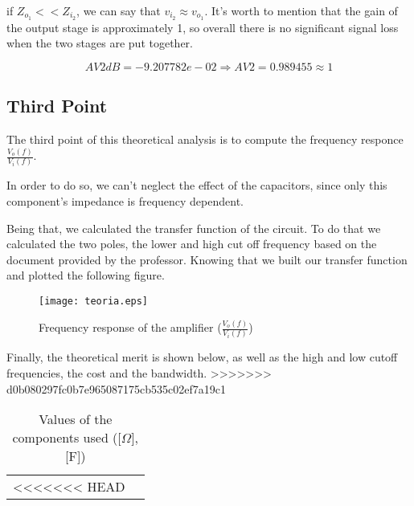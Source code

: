 \noindent if $Z_{o_1}<<Z_{i_2}$, we can say that $v_{i_2} \approx v_{o_1}$. It's worth to mention that the gain of the output stage is approximately 1, so overall there is no significant signal loss when the two stages are put together.

\begin{equation}
	AV2dB = -9.207782e-02 \Rightarrow AV2 = 0.989455 \approx 1
\end{equation}

\subsection{Third Point}

\par The third point of this theoretical analysis is to compute the frequency responce $\frac{V_o(f)}{V_i(f)}$. 
\par In order to do so, we can't neglect the effect of the capacitors, since only this component's impedance is frequency dependent.
\par Being that, we calculated the transfer function of the circuit. To do that we calculated the two poles, the lower and high cut off frequency based on the document provided by the professor. Knowing that we built our transfer function and plotted the following figure.

\begin{figure}[H] 
	\centering
	\texttt{[image: teoria.eps]}
	\caption{Frequency response of the amplifier ($\frac{V_o(f)}{V_i(f)}$)}
\end{figure}

\par Finally, the theoretical merit is shown below, as well as the high and low cutoff frequencies, the cost and the bandwidth.
>>>>>>> d0b080297fc0b7e965087175cb535c02ef7a19c1

\vspace{5mm}
\begin{table}[H]
	\centering
	\begin{tabularx}{0.9\textwidth} {
 	    | >{\raggedright\arraybackslash}X
  	    | >{\raggedleft\arraybackslash}X | }
	\hline
<<<<<<< HEAD
	
	\end{tabularx}
	\caption{Values of the components used ([$\Omega$],[F])}
	\label{tab:currents}
\end{table}
\vspace{5mm}

